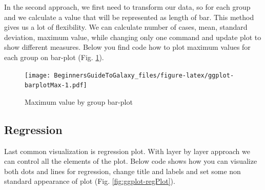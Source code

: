 \documentclass[]{book}
\newenvironment{Shaded}{\begin{snugshade}}{\end{snugshade}}
\newcommand{\KeywordTok}[1]{\textcolor[rgb]{0.13,0.29,0.53}{\textbf{#1}}}
\newcommand{\DataTypeTok}[1]{\textcolor[rgb]{0.13,0.29,0.53}{#1}}
\newcommand{\StringTok}[1]{\textcolor[rgb]{0.31,0.60,0.02}{#1}}
\newcommand{\OperatorTok}[1]{\textcolor[rgb]{0.81,0.36,0.00}{\textbf{#1}}}
\newcommand{\NormalTok}[1]{#1}
\theoremstyle{definition}
\theoremstyle{definition}
\theoremstyle{definition}
\theoremstyle{remark}
\begin{document}
In the second approach, we first need to transform our data, so for each
group and we calculate a value that will be represented as length of
bar. This method gives us a lot of flexibility. We can calculate number
of cases, mean, standard deviation, maximum value, while changing only
one command and update plot to show different measures. Below you find
code how to plot maximum values for each group on bar-plot (Fig.
\ref{fig:ggplot-barplotMax}).

\begin{Shaded}
\end{Shaded}

\begin{figure}
\centering
\texttt{[image: BeginnersGuideToGalaxy\_files/figure-latex/ggplot-barplotMax-1.pdf]}
\caption{\label{fig:ggplot-barplotMax}Maximum value by group bar-plot}
\end{figure}

\subsection{Regression}\label{regression}

Last common visualization is regression plot. With layer by layer
approach we can control all the elements of the plot. Below code shows
how you can visualize both dots and lines for regression, change title
and labels and set some non standard appearance of plot (Fig.
\ref{fig:ggplot-regPlot}).
\end{document}
